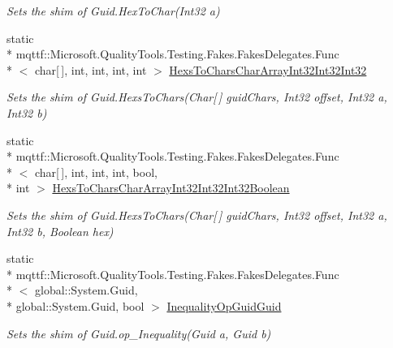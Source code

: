 \begin{DoxyCompactItemize}
\begin{DoxyCompactList}\small\item\em Sets the shim of Guid.\-Hex\-To\-Char(\-Int32 a)\end{DoxyCompactList}\item 
static \\*
mqttf\-::\-Microsoft.\-Quality\-Tools.\-Testing.\-Fakes.\-Fakes\-Delegates.\-Func\\*
$<$ char\mbox{[}$\,$\mbox{]}, int, int, int, int $>$ \hyperlink{class_system_1_1_fakes_1_1_shim_guid_ab52415df38c58c48e9ed5665118c7ce7}{Hexs\-To\-Chars\-Char\-Array\-Int32\-Int32\-Int32}
\begin{DoxyCompactList}\small\item\em Sets the shim of Guid.\-Hexs\-To\-Chars(\-Char\mbox{[}$\,$\mbox{]} guid\-Chars, Int32 offset, Int32 a, Int32 b)\end{DoxyCompactList}\item 
static \\*
mqttf\-::\-Microsoft.\-Quality\-Tools.\-Testing.\-Fakes.\-Fakes\-Delegates.\-Func\\*
$<$ char\mbox{[}$\,$\mbox{]}, int, int, int, bool, \\*
int $>$ \hyperlink{class_system_1_1_fakes_1_1_shim_guid_ad0f7bb711e5a5908732864995f8f4cec}{Hexs\-To\-Chars\-Char\-Array\-Int32\-Int32\-Int32\-Boolean}
\begin{DoxyCompactList}\small\item\em Sets the shim of Guid.\-Hexs\-To\-Chars(\-Char\mbox{[}$\,$\mbox{]} guid\-Chars, Int32 offset, Int32 a, Int32 b, Boolean hex)\end{DoxyCompactList}\item 
static \\*
mqttf\-::\-Microsoft.\-Quality\-Tools.\-Testing.\-Fakes.\-Fakes\-Delegates.\-Func\\*
$<$ global\-::\-System.\-Guid, \\*
global\-::\-System.\-Guid, bool $>$ \hyperlink{class_system_1_1_fakes_1_1_shim_guid_a64a9ce7b0d861689099d237657d7ee94}{Inequality\-Op\-Guid\-Guid}
\begin{DoxyCompactList}\small\item\em Sets the shim of Guid.\-op\-\_\-\-Inequality(\-Guid a, Guid b)\end{DoxyCompactList}\item 

\end{DoxyCompactItemize}
